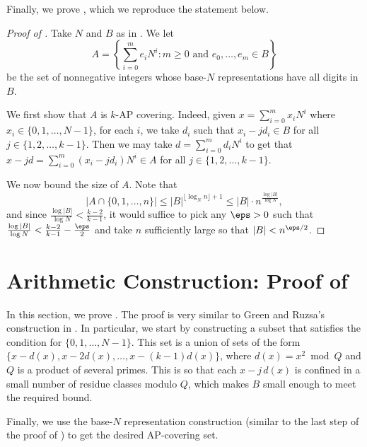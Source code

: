 \documentclass[11pt,reqno]{amsart}
\begin{document}
Finally, we prove ,
which we reproduce the statement below.
\fourier*
\begin{proof}[Proof of ]
Take $N$ and $B$ as in .
We let 
$$A = \left\{\sum_{i=0}^m e_i N^i 
: m\geq 0 \text{ and }e_0,\dots,e_m\in B\right\}$$
be the set of nonnegative integers whose base-$N$
representations have all digits in $B$.

We first show that $A$ is $k$-AP covering.
Indeed, given $x=\sum_{i=0}^m x_iN^i$ where 
$x_i\in \{0,1,\dots,N-1\}$,
for each $i$, we take $d_i$ such that $x_i-jd_i\in B$
for all $j\in\{1,2,\dots,k-1\}$.
Then we may take $d=\sum_{i=0}^m d_iN^i$ to get that 
$x-jd = \sum_{i=0}^m (x_i-jd_i)N^i\in A$
for all $j\in\{1,2,\dots,k-1\}$.

We now bound the size of $A$.
Note that 
$$|A\cap \{0,1,\dots,n\}| 
\leq |B|^{\lfloor\log_N n\rfloor+1} 
\leq |B| \cdot n^{\frac{\log|B|}{\log N}},$$
and since $\frac{\log |B|}{\log N} 
< \frac{k-2}{k-1}$, it would suffice to pick 
any $\eps>0$ such that $\frac{\log |B|}{\log N} 
< \frac{k-2}{k-1}-\frac{\eps}2$
and take $n$ sufficiently large so that $|B| < n^{\eps/2}$.
\end{proof}
%
%
\section{Arithmetic Construction: Proof of \texorpdfstring{}{Theorem \ref{thm:arithmetic}}}
\label{sec:arithmetic}
In this section, we prove .
The proof is very similar to 
Green and Ruzsa's construction in \cite[Thm.~1.2]{arithmetic_kakeya}.
In particular, we start by constructing a subset 
that satisfies the condition for $\{0,1,\dots,N-1\}$.
This set is a union of sets of the form 
$\{x-d(x), x-2d(x),\dots,x-(k-1)d(x)\}$,
where $d(x)=x^2\bmod Q$ and $Q$ is a product of several primes.
This is so that each $x-j\,d(x)$ is confined 
in a small number of residue classes modulo $Q$,
which makes $B$ small enough to meet the required bound.

Finally, we use the base-$N$ representation 
construction (similar to the last step of 
the proof of ) 
to get the desired AP-covering set.
\end{document}
